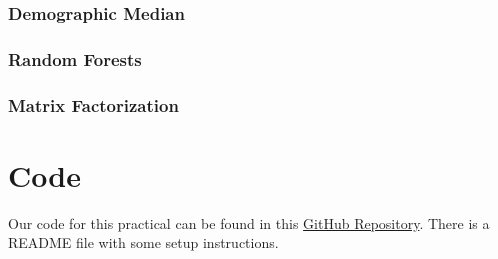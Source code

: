 \documentclass[10pt]{article}
\begin{document}
\subsubsection{Demographic Median} 

\subsubsection{Random Forests} 

\subsubsection{Matrix Factorization} 

\section{Code}

Our code for this practical can be found in this
\href{https://github.com/victordomene/cs181-practicals/tree/master/practical3}{GitHub
Repository}. There is a README file with some setup instructions.
\end{document}
